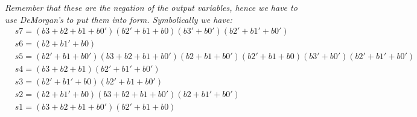 \begin{enumerate}
\begin{enumerate}
\begin{onlysolution}
                        \itshape{Remember that these are the negation of the output variables, hence
                            we have to use DeMorgan's to put them into \POSmin form.
                        Symbolically we have:}
                        \begin{align*}
                            &s7=(b3+b2+b1+b0')(b2'+b1+b0)(b3'+b0')(b2'+b1'+b0') \\
                            &s6=(b2+b1'+b0) \\
                            &s5=(b2'+b1+b0')(b3+b2+b1+b0')(b2+b1+b0')(b2'+b1+b0)(b3'+b0')(b2'+b1'+b0') \\
                            &s4=(b3+b2+b1)(b2'+b1'+b0') \\
                            &s3=(b2'+b1'+b0)(b2'+b1+b0') \\
                            &s2=(b2+b1'+b0)(b3+b2+b1+b0')(b2+b1'+b0') \\
                            &s1=(b3+b2+b1+b0')(b2'+b1+b0) \\
                        \end{align*}
                    \end{onlysolution}
            \end{enumerate}


\end{enumerate}
